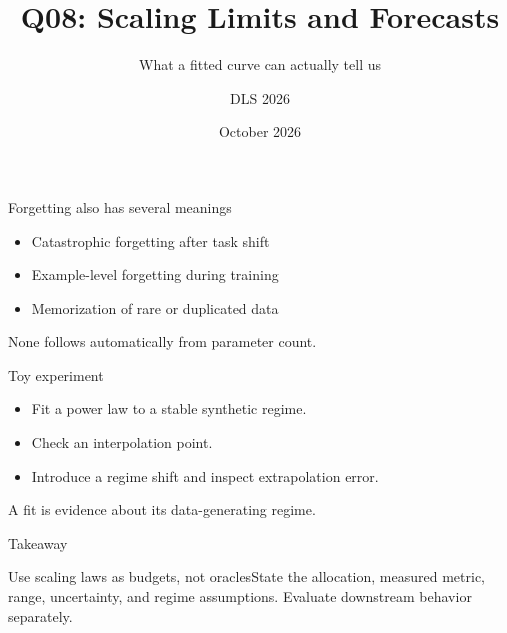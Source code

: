 \documentclass[aspectratio=169,10pt]{beamer}\usetheme{metropolis}\title{Q08: Scaling Limits and Forecasts}\subtitle{What a fitted curve can actually tell us}\author{DLS 2026}\date{October 2026}
\begin{document}
\begin{frame}{Forgetting also has several meanings}\begin{itemize}\item Catastrophic forgetting after task shift\item Example-level forgetting during training\item Memorization of rare or duplicated data\end{itemize}\alert{None follows automatically from parameter count.}\end{frame}
\begin{frame}{Toy experiment}\begin{itemize}\item Fit a power law to a stable synthetic regime.\item Check an interpolation point.\item Introduce a regime shift and inspect extrapolation error.\end{itemize}\vfill A fit is evidence about its data-generating regime.\end{frame}
\begin{frame}{Takeaway}\begin{block}{Use scaling laws as budgets, not oracles}State the allocation, measured metric, range, uncertainty, and regime assumptions. Evaluate downstream behavior separately.\end{block}\end{frame}
\end{document}
